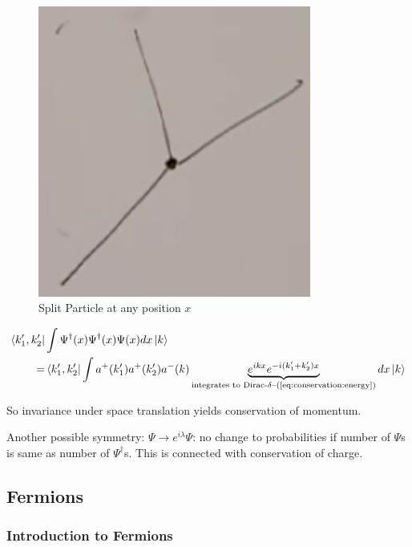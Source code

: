 \documentclass[]{article}
\begin{document}
\begin{figure}[H]
	\caption{Split Particle at any position $x$}\label{fig:split:particle}
	\includegraphics[width=0.8\textwidth]{split-particle1}
\end{figure}

\begin{align*}
\bra{k_1^\prime,k_2^\prime}&\int \Psi^\dagger(x)\Psi^\dagger(x)\Psi(x) dx\ket{k}\\
=&\bra{k_1^\prime,k_2^\prime}\int a^+(k_1^\prime) a^+(k_2^\prime) a^-(k) \underbrace{e^{ikx} e^{-i(k_1^\prime+k_2^\prime)x}}_\text{integrates to Dirac-$\delta$--(\ref{eq:conservation:energy})} dx\ket{k}
\end{align*}

So invariance under space translation yields conservation of momentum.

Another possible symmetry: $\Psi \rightarrow e^{i \lambda} \Psi$: no change to probabilities if number of $\Psi$s is same as number of $\Psi^\dagger$s. This is connected with conservation of charge.

\subsection{Fermions}

\subsubsection{Introduction to Fermions}
\end{document}
